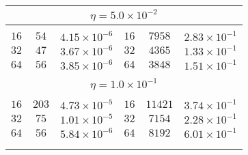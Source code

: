 \documentclass[10pt]{article}
\begin{document}
\begin{table}[]
\begin{center}
\begin{tabular}{@{}ccc|ccc@{}}
\multicolumn{6}{c}{$\eta = 5.0\times 10^{-2}$} \\[5pt]
\hline\\[-11pt]
$16$ & $54$ & $4.15\times 10^{-6}$  &   $16$ & $7958$ & $2.83\times 10^{-1}$ \\ [1pt]
$32$ & $47$ & $3.67\times 10^{-6}$  &   $32$ & $4365$ & $1.33\times 10^{-1}$ \\ [1pt]
$64$ & $56$ & $3.85\times 10^{-6}$  &   $64$ & $3848$ & $1.51\times 10^{-1}$ \\ [1pt]
\hline\\[-11pt]

\multicolumn{6}{c}{$\eta = 1.0\times 10^{-1}$} \\[5pt]
\hline\\[-11pt]
$16$ & $203$ & $4.73\times 10^{-5}$ &   $16$ & $11421$ & $3.74\times 10^{-1}$\\ [1pt]
$32$ & $75$ & $1.01\times 10^{-5}$  &   $32$ & $7154$ & $2.28\times 10^{-1}$ \\ [1pt]
$64$ & $56$ & $5.84\times 10^{-6}$  &   $64$ & $8192$ & $6.01\times 10^{-1}$ \\ [1pt]
\hline\\[-11pt]


\hline\\[-8pt]
\end{tabular}\\[5pt]
\end{center}
\normalsize
\end{table}
\end{document}
